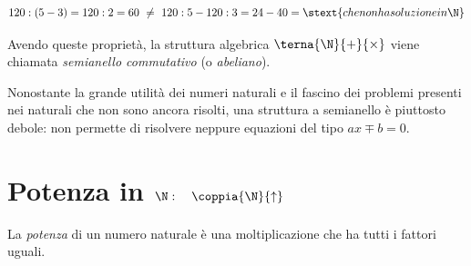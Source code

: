 \vspace{-1.5em}
\[120 : (5 - 3) = 120 : 2 = 60 ~\neq~ 
120 : 5 - 120 : 3 = 24 - 40 = \stext{che non ha soluzione in \N}\]


Avendo queste proprietà, la struttura algebrica \(\terna{\N}{+}{\times}\) 
viene chiamata \emph{semianello commutativo} (o \emph{abeliano}).

\begin{osservazione}{}{}
Nonostante la grande utilità dei numeri naturali e il fascino dei problemi 
presenti nei naturali che non sono ancora risolti, una struttura a 
semianello è piuttosto debole:
non permette di risolvere neppure equazioni del tipo \(ax \mp b = 0\).
\end{osservazione}


% 

\section{Potenza in $\N: \quad \coppia{\N}{\uparrow}$}
\label{sec:nat_potenza}

La \emph{potenza} di un numero naturale è una moltiplicazione che ha tutti 
i fattori uguali.

